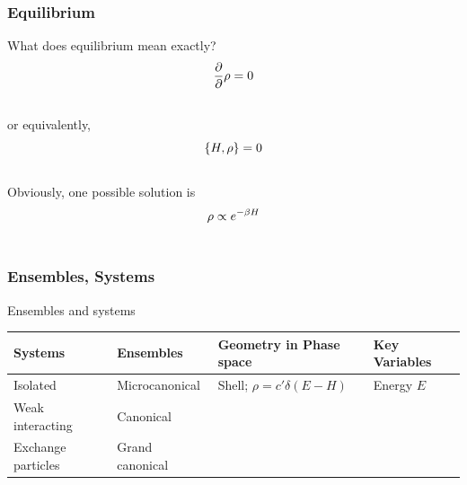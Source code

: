 \documentclass[letterpaper,10pt,english]{sphinxmanual}
\begin{document}
\subsubsection{Equilibrium}
\label{equilibrium/week5:equilibrium}
What does equilibrium mean exactly?
\begin{gather}
\begin{split}\frac{\partial}{\partial} \rho  = 0\end{split}\notag\\\begin{split}\end{split}\notag
\end{gather}
or equivalently,
\begin{gather}
\begin{split}\{ H, \rho \} =0\end{split}\notag\\\begin{split}\end{split}\notag
\end{gather}
Obviously, one possible solution is
\begin{gather}
\begin{split}\rho \propto e^{-\beta H}\end{split}\notag\\\begin{split}\end{split}\notag
\end{gather}

\subsubsection{Ensembles, Systems}
\label{equilibrium/week5:ensembles-systems}

\begin{threeparttable}
\capstart\caption{Ensembles and systems}

\begin{tabulary}{\linewidth}{|L|L|L|L|}
\hline
\textsf{\relax 
Systems
} & \textsf{\relax 
Ensembles
} & \textsf{\relax 
Geometry in Phase space
} & \textsf{\relax 
Key Variables
}\\
\hline
Isolated
 & 
Microcanonical
 & 
Shell; $\rho = c'\delta(E-H)$
 & 
Energy $E$
\\

Weak interacting
 & 
Canonical
 &  & \\

Exchange particles
 & 
Grand canonical
 &  & \\
\hline\end{tabulary}

\end{threeparttable}
\end{document}
